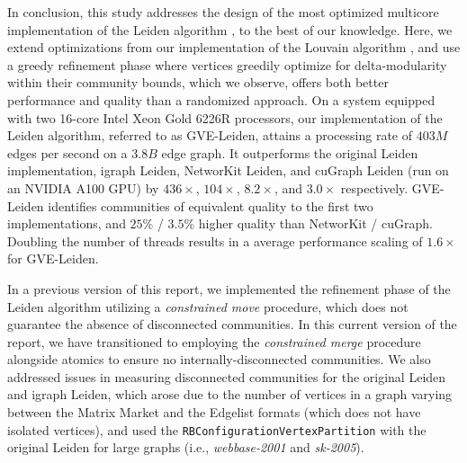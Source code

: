 In conclusion, this study addresses the design of the most optimized multicore implementation of the Leiden algorithm \cite{com-traag19}, to the best of our knowledge. Here, we extend optimizations from our implementation of the Louvain algorithm \cite{sahu2023gvelouvain}, and use a greedy refinement phase where vertices greedily optimize for delta-modularity within their community bounds, which we observe, offers both better performance and quality than a randomized approach. On a system equipped with two 16-core Intel Xeon Gold 6226R processors, our implementation of the Leiden algorithm, referred to as GVE-Leiden, attains a processing rate of $403 M$ edges per second on a $3.8 B$ edge graph. It outperforms the original Leiden implementation, igraph Leiden, NetworKit Leiden, and cuGraph Leiden (run on an NVIDIA A100 GPU) by $436\times$, $104\times$, $8.2\times$, and $3.0\times$ respectively. GVE-Leiden identifies communities of equivalent quality to the first two implementations, and $25\%$ / $3.5\%$ higher quality than NetworKit / cuGraph. Doubling the number of threads results in a average performance scaling of $1.6\times$ for GVE-Leiden.

In a previous version of this report, we implemented the refinement phase of the Leiden algorithm utilizing a \textit{constrained move} procedure, which does not guarantee the absence of disconnected communities. In this current version of the report, we have transitioned to employing the \textit{constrained merge} procedure alongside atomics to ensure no internally-disconnected communities. We also addressed issues in measuring disconnected communities for the original Leiden and igraph Leiden, which arose due to the number of vertices in a graph varying between the Matrix Market and the Edgelist formats (which does not have isolated vertices), and used the \texttt{RBConfigurationVertexPartition} with the original Leiden for large graphs (i.e., \textit{webbase-2001} and \textit{sk-2005}).
